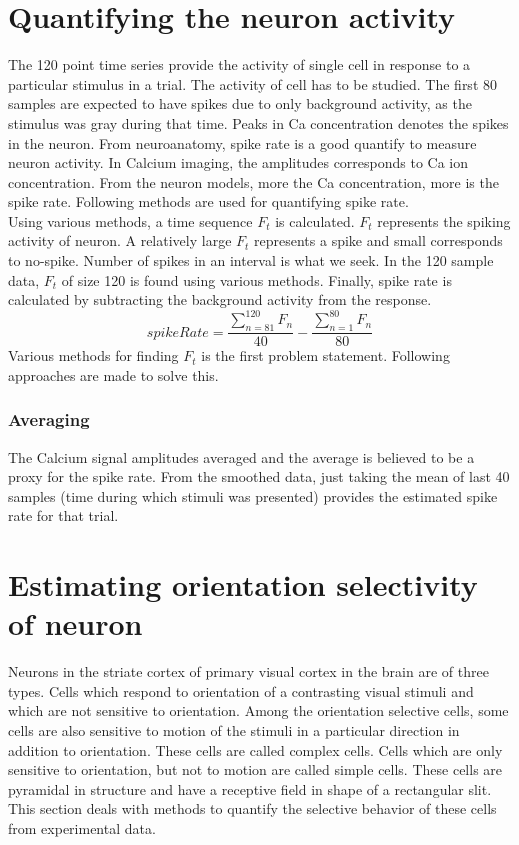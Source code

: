 \documentclass[11pt]{article}
\begin{document}
\section{Quantifying the neuron activity} %
\label{sub:quantifying_the_neuron_activity}
The 120 point time series provide the activity of single cell in response to a particular stimulus in a trial. The activity of cell has to be studied. The first 80 samples are expected to have spikes due to only background activity, as the stimulus was gray during that time. Peaks in Ca concentration denotes the spikes in the neuron. From neuroanatomy, spike rate is a good quantify to measure neuron activity. In Calcium imaging, the amplitudes corresponds to Ca ion concentration. From the neuron models, more the Ca concentration, more is the spike rate. Following methods are used for quantifying spike rate.\\
Using various methods, a time sequence $F_t$ is calculated. $F_t$ represents the spiking activity of neuron. A relatively large $F_t$ represents a spike and small corresponds to no-spike. Number of spikes in an interval is what we seek. In the 120 sample data, $F_t$ of size 120 is found using various methods. Finally, spike rate is calculated by subtracting the background activity from the response.
$$spikeRate = \frac{\sum_{n=81}^{120} F_n}{40} - \frac{\sum_{n=1}^{80} F_n}{80}$$
Various methods for finding $F_t$ is the first problem statement. Following approaches are made to solve this.
\subsubsection{Averaging } %
\label{ssub:averaging}
The Calcium signal amplitudes averaged and the average is believed to be a proxy for the spike rate. From the smoothed data, just taking the mean of last 40 samples (time during which stimuli was presented) provides the estimated spike rate for that trial.

\FloatBarrier
\section{Estimating orientation selectivity of neuron} %
\label{sub:estimating_orientation_selectivity_of_neuron}
Neurons in the striate cortex of primary visual cortex in the brain are of three types. Cells which respond to orientation of a contrasting visual stimuli and which are not sensitive to orientation. Among the orientation selective cells, some cells are also sensitive to motion of the stimuli in a particular direction in addition to orientation. These cells are called complex cells. Cells which are only sensitive  to orientation, but not to motion are called simple cells. These cells are pyramidal in structure and have a receptive field in shape of a rectangular slit. This section deals with methods to quantify the selective behavior of these cells from experimental data.
\end{document}
